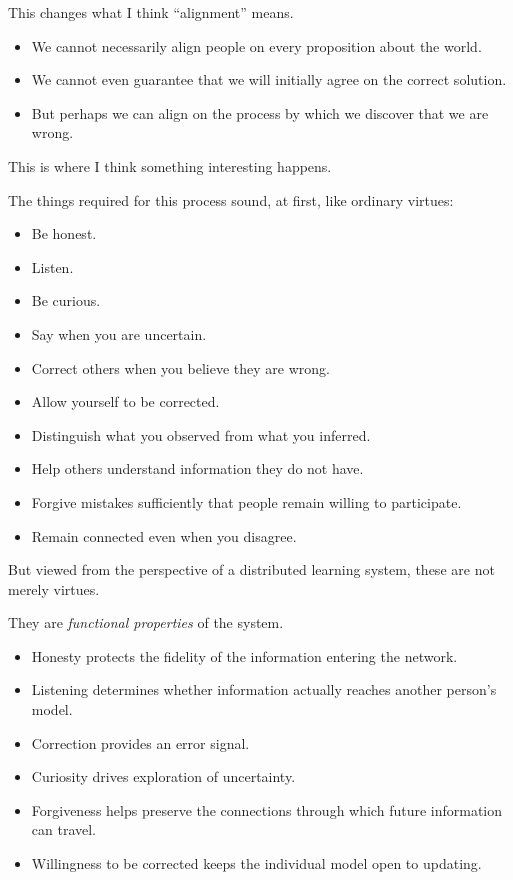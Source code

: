 \documentclass{article}
\begin{document}
This changes what I think ``alignment'' means.

\begin{itemize}
    \item We cannot necessarily align people on every proposition about the world.
    \item We cannot even guarantee that we will initially agree on the correct solution.
    \item But perhaps we can align on the process by which we discover that we are wrong.
\end{itemize}

This is where I think something interesting happens.

The things required for this process sound, at first, like ordinary virtues:

\begin{itemize}
    \item Be honest.
    \item Listen.
    \item Be curious.
    \item Say when you are uncertain.
    \item Correct others when you believe they are wrong.
    \item Allow yourself to be corrected.
    \item Distinguish what you observed from what you inferred.
    \item Help others understand information they do not have.
    \item Forgive mistakes sufficiently that people remain willing to participate.
    \item Remain connected even when you disagree.
\end{itemize}

But viewed from the perspective of a distributed learning system, these are not merely virtues.

They are \textit{functional properties} of the system.

\begin{itemize}
    \item Honesty protects the fidelity of the information entering the network.
    \item Listening determines whether information actually reaches another person's model.
    \item Correction provides an error signal.
    \item Curiosity drives exploration of uncertainty.
    \item Forgiveness helps preserve the connections through which future information can travel.
    \item Willingness to be corrected keeps the individual model open to updating.
\end{itemize}
\end{document}
